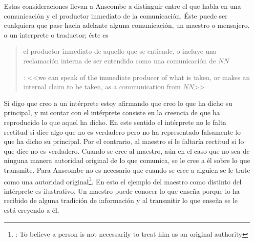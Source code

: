 Estas consideraciones llevan a Anscombe a distinguir entre el que habla en una comunicación y el productor inmediato de la comunicación. Éste puede ser cualquiera que pase hacia adelante alguna comunicación, un maestro o mensajero, o un interprete o traductor; éste es \blockquote[{\cite[8]{anscombe2008faith:tobelieve}}: <<we can speak of the immediate producer of what is taken, or makes an internal claim to be taken, as a communication from $NN$>>]{el productor inmediato de aquello que se entiende, o incluye una reclamación interna de ser entendido como una comunicación de $NN$}. Si digo que creo a un intérprete estoy afirmando que creo lo que ha dicho su principal, y mi contar con el intérprete consiste en la creencia de que ha reproducido lo que aquel ha dicho. En este sentido el intérprete no le falta rectitud si dice algo que no es verdadero pero no ha representado falsamente lo que ha dicho su principal. Por el contrario, al maestro sí le faltaría rectitud si lo que dice no es verdadero. Cuando se cree al maestro, aún en el caso que no sea de ninguna manera autoridad original de lo que comunica, se le cree a él sobre lo que transmite. Para Anscombe no es necesario que cuando se cree a alguien se le trate como una autoridad original\footnote{\cite[Cf.~][5]{anscombe2008faith:tobelieve}: To believe a person is not necessarily to treat him as an original authority}. En esto el ejemplo del maestro como distinto del intérprete es ilustrativo. Un maestro puede conocer lo que enseña porque lo ha recibido de alguna tradición de información y al transmitir lo que enseña se le está creyendo a él.

